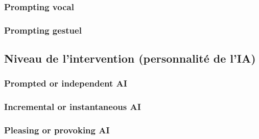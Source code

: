 \subsubsection{Prompting vocal}
\subsubsection{Prompting gestuel}
\subsection{Niveau de l'intervention (personnalité de l'IA)}
\subsubsection{Prompted or independent AI}
\subsubsection{Incremental or instantaneous AI}
\subsubsection{Pleasing or provoking AI}
